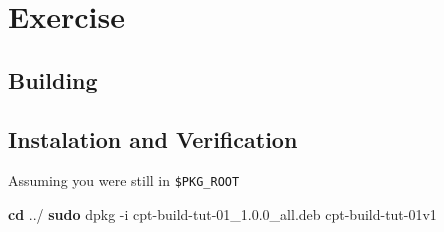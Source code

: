 \documentclass[]{article}
\newenvironment{Shaded}{}{}
\newcommand{\KeywordTok}[1]{\textcolor[rgb]{0.00,0.44,0.13}{\textbf{{#1}}}}
\newcommand{\OtherTok}[1]{\textcolor[rgb]{0.00,0.44,0.13}{{#1}}}
\newcommand{\NormalTok}[1]{{#1}}
\begin{document}
\section{Exercise}

\begin{Shaded}
\end{Shaded}
\subsection{Building}

\begin{Shaded}
\end{Shaded}
\subsection{Instalation and Verification}

Assuming you were still in \texttt{\$PKG\_ROOT}

\begin{Shaded}
\begin{Highlighting}[]
\KeywordTok{cd} \NormalTok{../}
\KeywordTok{sudo} \NormalTok{dpkg -i cpt-build-tut-01_1.0.0_all.deb}
\NormalTok{cpt-build-tut-01v1}
\end{Highlighting}
\end{Shaded}
\end{document}
